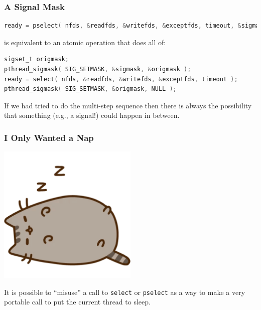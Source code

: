 \begin{frame}[fragile]
	\frametitle{A Signal Mask}

	\begin{lstlisting}[language=C]
ready = pselect( nfds, &readfds, &writefds, &exceptfds, timeout, &sigmask );
\end{lstlisting}

	is equivalent to an atomic operation that does all of:

	\begin{lstlisting}[language=C]
sigset_t origmask;
pthread_sigmask( SIG_SETMASK, &sigmask, &origmask );
ready = select( nfds, &readfds, &writefds, &exceptfds, timeout );
pthread_sigmask( SIG_SETMASK, &origmask, NULL );
\end{lstlisting}

	If we had tried to do the multi-step sequence then there is always the possibility that something (e.g., a signal!) could happen in between.

\end{frame}


\begin{frame}
	\frametitle{I Only Wanted a Nap}

	\begin{center}
		\includegraphics[width=0.5\textwidth]{images/pusheen-nap.png}
	\end{center}

	It is possible to ``misuse'' a call to \texttt{select} or \texttt{pselect} as a way to make a very portable call to put the current thread to sleep.

\end{frame}


